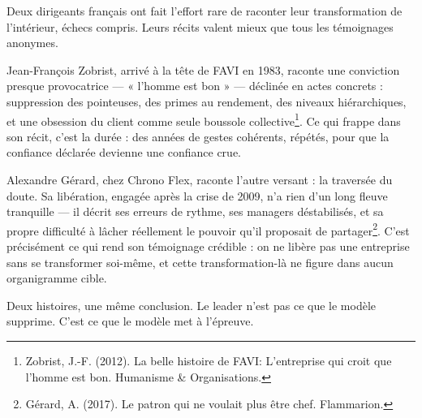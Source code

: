 Deux dirigeants français ont fait l'effort rare de raconter leur transformation de l'intérieur, échecs compris. Leurs récits valent mieux que tous les témoignages anonymes.

Jean-François Zobrist, arrivé à la tête de FAVI en 1983, raconte une conviction presque provocatrice — « l'homme est bon » — déclinée en actes concrets : suppression des pointeuses, des primes au rendement, des niveaux hiérarchiques, et une obsession du client comme seule boussole collective\footnote{Zobrist, J.-F. (2012). La belle histoire de FAVI: L'entreprise qui croit que l'homme est bon. Humanisme \& Organisations.}. Ce qui frappe dans son récit, c'est la durée : des années de gestes cohérents, répétés, pour que la confiance déclarée devienne une confiance crue.

Alexandre Gérard, chez Chrono Flex, raconte l'autre versant : la traversée du doute. Sa libération, engagée après la crise de 2009, n'a rien d'un long fleuve tranquille — il décrit ses erreurs de rythme, ses managers déstabilisés, et sa propre difficulté à lâcher réellement le pouvoir qu'il proposait de partager\footnote{Gérard, A. (2017). Le patron qui ne voulait plus être chef. Flammarion.}. C'est précisément ce qui rend son témoignage crédible : on ne libère pas une entreprise sans se transformer soi-même, et cette transformation-là ne figure dans aucun organigramme cible.

Deux histoires, une même conclusion. Le leader n'est pas ce que le modèle supprime. C'est ce que le modèle met à l'épreuve.
